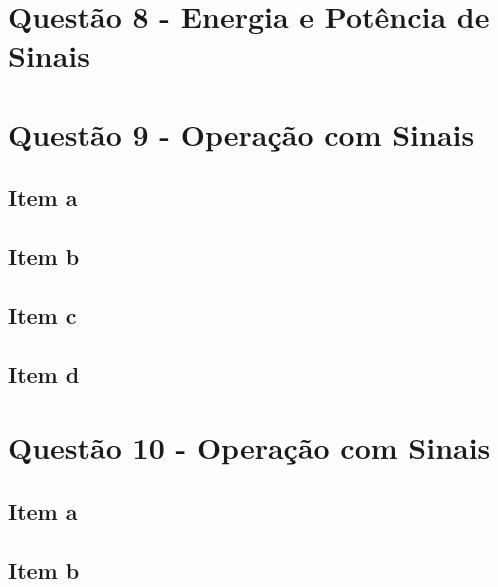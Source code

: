 \documentclass[a4paper, 12pt]{article}
\begin{document}
	\section{Quest\~{a}o 8 - Energia e Potência de Sinais}	
	\section{Quest\~{a}o 9 - Operação com Sinais}
		\subsection{Item a}	
		\subsection{Item b}	
		\subsection{Item c}	
		\subsection{Item d}		
	\section{Quest\~{a}o 10 - Operação com Sinais}
		\subsection{Item a}	
		\subsection{Item b}					
		


		
\end{document}
